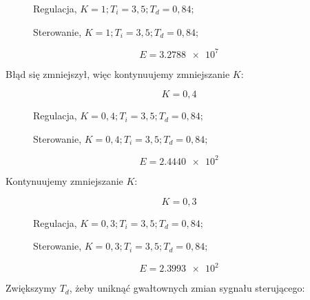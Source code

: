 \begin{figure}[H]
\centering

\caption{Regulacja, $K = 1; T_i=3,5; T_d=0,84;$}
\end{figure}

\begin{figure}[H]
\centering

\caption{Sterowanie, $K = 1; T_i=3,5; T_d=0,84;$}
\end{figure}

\begin{equation}
    E = \num{3,2788e7}
\end{equation}

Błąd się zmniejszył, więc kontynuujemy zmniejszanie $K$:

\begin{equation}
    K = 0,4
\end{equation}

\begin{figure}[H]
\centering

\caption{Regulacja, $K = 0,4; T_i=3,5; T_d=0,84;$}
\end{figure}

\begin{figure}[H]
\centering

\caption{Sterowanie, $K = 0,4; T_i=3,5; T_d=0,84;$}
\end{figure}

\begin{equation}
    E = \num{2,4440e2}
\end{equation}

Kontynuujemy zmniejszanie $K$:

\begin{equation}
    K = 0,3
\end{equation}

\begin{figure}[H]
\centering

\caption{Regulacja, $K = 0,3; T_i=3,5; T_d=0,84;$}
\end{figure}

\begin{figure}[H]
\centering

\caption{Sterowanie, $K = 0,3; T_i=3,5; T_d=0,84;$}
\end{figure}

\begin{equation}
    E = \num{2,3993e2}
\end{equation}

Zwiększymy $T_d$, żeby uniknąć gwałtownych zmian sygnału sterującego:

